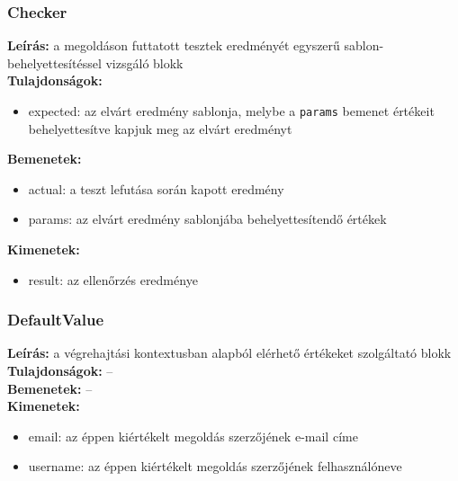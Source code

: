 \subsubsection{Checker}
\textbf{Leírás:} a megoldáson futtatott tesztek eredményét egyszerű sablon-behelyettesítéssel vizsgáló blokk \\
\textbf{Tulajdonságok:}
\begin{itemize}
    \item expected: az elvárt eredmény sablonja, melybe a \texttt{params} bemenet értékeit behelyettesítve kapjuk meg az elvárt eredményt
\end{itemize}
\textbf{Bemenetek:}
\begin{itemize}
    \item actual: a teszt lefutása során kapott eredmény
    \item params: az elvárt eredmény sablonjába behelyettesítendő értékek
\end{itemize}
\textbf{Kimenetek:}
\begin{itemize}
    \item result: az ellenőrzés eredménye
\end{itemize}

\subsubsection{DefaultValue}
\textbf{Leírás:} a végrehajtási kontextusban alapból elérhető értékeket szolgáltató blokk \\
\textbf{Tulajdonságok:} -- \\
\textbf{Bemenetek:} -- \\
\textbf{Kimenetek:}
\begin{itemize}
    \item email: az éppen kiértékelt megoldás szerzőjének e-mail címe
    \item username: az éppen kiértékelt megoldás szerzőjének felhasználóneve
\end{itemize}

